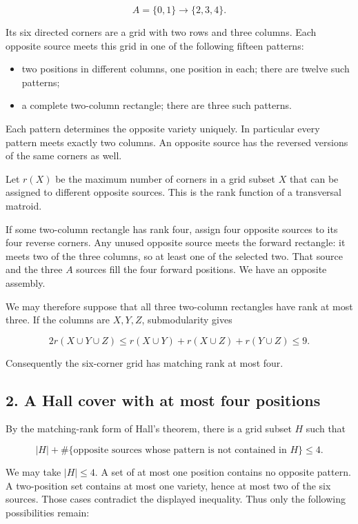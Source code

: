 \documentclass[
  10pt,
]{article}
\providecommand{\tightlist}{%
  \setlength{\itemsep}{0pt}\setlength{\parskip}{0pt}}
\begin{document}
\[
A=\{0,1\}\longrightarrow\{2,3,4\}.
\]

Its six directed corners are a grid with two rows and three columns.
Each opposite source meets this grid in one of the following fifteen
patterns:

\begin{itemize}
\tightlist
\item
  two positions in different columns, one position in each; there are
  twelve such patterns;
\item
  a complete two-column rectangle; there are three such patterns.
\end{itemize}

Each pattern determines the opposite variety uniquely. In particular
every pattern meets exactly two columns. An opposite source has the
reversed versions of the same corners as well.

Let \(r(X)\) be the maximum number of corners in a grid subset \(X\)
that can be assigned to different opposite sources. This is the rank
function of a transversal matroid.

If some two-column rectangle has rank four, assign four opposite sources
to its four reverse corners. Any unused opposite source meets the
forward rectangle: it meets two of the three columns, so at least one of
the selected two. That source and the three \(A\) sources fill the four
forward positions. We have an opposite assembly.

We may therefore suppose that all three two-column rectangles have rank
at most three. If the columns are \(X,Y,Z\), submodularity gives

\[
2r(X\cup Y\cup Z)
\le r(X\cup Y)+r(X\cup Z)+r(Y\cup Z)\le9.
\]

Consequently the six-corner grid has matching rank at most four.

\hypertarget{a-hall-cover-with-at-most-four-positions}{%
\subsection*{2. A Hall cover with at most four
positions}\label{a-hall-cover-with-at-most-four-positions}}

By the matching-rank form of Hall's theorem, there is a grid subset
\(H\) such that

\[
|H|+\#\{\text{opposite sources whose pattern is not contained in }H\}
\le4.
\]

We may take \(|H|\le4\). A set of at most one position contains no
opposite pattern. A two-position set contains at most one variety, hence
at most two of the six sources. Those cases contradict the displayed
inequality. Thus only the following possibilities remain:
\end{document}
